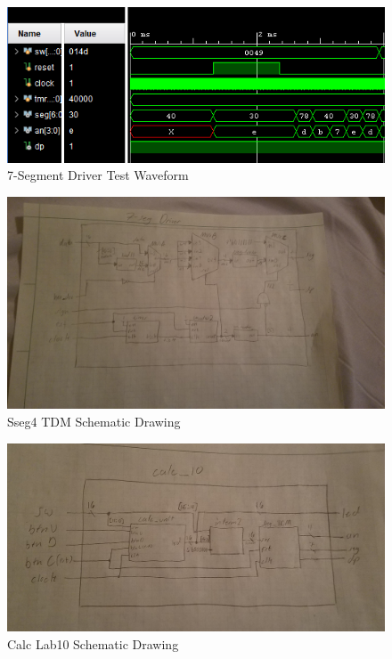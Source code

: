 \documentclass[11pt]{article}
\begin{document}
\begin{figure}[ht]\centering
	\includegraphics[width=1.0\textwidth,trim=0 0mm 0 0,clip]{SsegTDMTest}
	\caption{7-Segment Driver Test Waveform}
\end{figure}


	
\begin{figure}[ht]\centering
	\includegraphics[width=1.0\textwidth,trim=0 0mm 0 0,clip]{7seg}
	\caption{Sseg4 TDM Schematic Drawing}
\end{figure}

\begin{figure}[ht]\centering
	\includegraphics[width=1.0\textwidth,trim=0 0mm 0 0,clip]{calc101}
	\caption{Calc Lab10 Schematic Drawing}
\end{figure}
\clearpage
\end{document}
